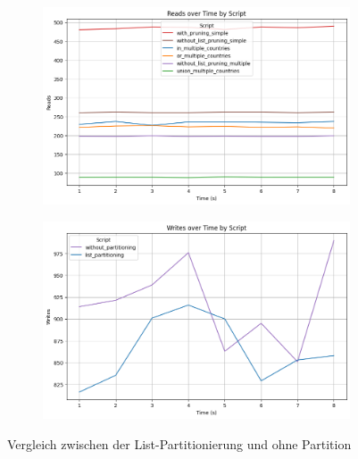 \vspace{-6pt}
\begin{figure}[H]
	\centering
	\begin{subfigure}[t]{0.48\textwidth}
		\includegraphics[width=\textwidth]{PNGs/Script/Partition/list-partition/Reads}
	\end{subfigure}
	\hfill
	\begin{subfigure}[t]{0.48\textwidth}
		\includegraphics[width=\textwidth]{PNGs/Script/Partition/list-partition/Writes}
	\end{subfigure}
	\vspace{-8pt}
	\caption[List-Partitionierung: Unterschiedliche Abfragen mit und ohne Partition]{Vergleich zwischen der List-Partitionierung und ohne Partition}
	\label{fig:list-partition}
\end{figure}
\vspace{-19pt}

